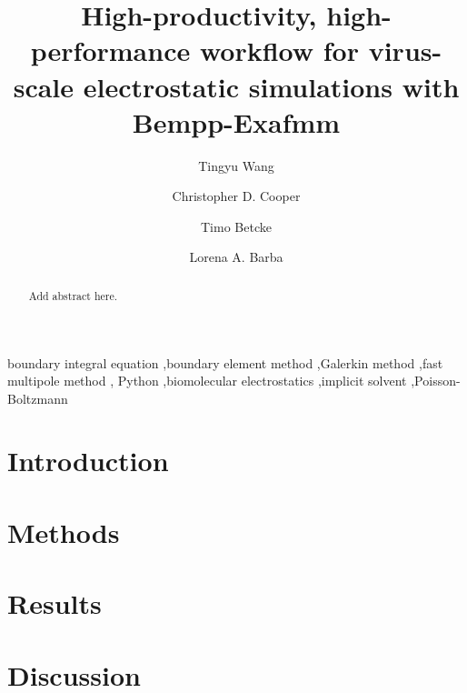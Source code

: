 \documentclass[final,5p,times,twocolumn]{elsarticle}
\begin{document}
\begin{frontmatter}
\title{High-productivity, high-performance workflow for virus-scale electrostatic simulations with Bempp-Exafmm}

\author[gwu]{Tingyu Wang}

\author[usm]{Christopher D. Cooper}

\author[ucl]{Timo Betcke}

\author[gwu]{Lorena A. Barba}

\address[gwu]{Department of Mechanical and Aerospace Engineering, The George Washington University, Washington DC}
\address[usm]{Department of Mechanical Engineering, Universidad T\'ecnica Federico Santa Mar\'ia, Valpara\'iso, Chile}
\address[ucl]{Department of Mathematics, University College London, UK}

\begin{abstract}
    Add abstract here.
\end{abstract}

\begin{keyword}
    boundary integral equation \sep boundary element method \sep Galerkin method \sep fast multipole method \sep
    Python \sep biomolecular electrostatics \sep implicit solvent \sep Poisson-Boltzmann
\end{keyword}

\end{frontmatter}

\section{Introduction}\label{sec:intro}


\section{Methods}\label{sec:methods}




\section{Results}\label{sec:results}


\section{Discussion} \label{sec:discussion}

\end{document}
